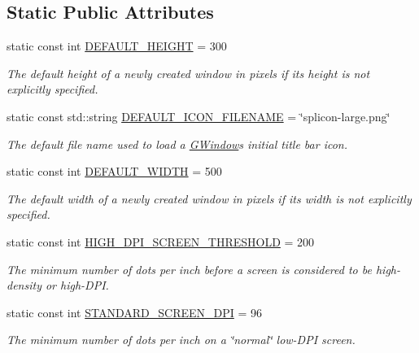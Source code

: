 \subsection*{Static Public Attributes}
\begin{DoxyCompactItemize}
\item 
static const int \mbox{\hyperlink{classsgl_1_1GWindow_a2fab6d7a2bcb15d1595cacc38230f21b}{D\+E\+F\+A\+U\+L\+T\+\_\+\+H\+E\+I\+G\+HT}} = 300
\begin{DoxyCompactList}\small\item\em The default height of a newly created window in pixels if its height is not explicitly specified. \end{DoxyCompactList}\item 
static const std\+::string \mbox{\hyperlink{classsgl_1_1GWindow_a666fcf3a55503322fbfd6314c4846542}{D\+E\+F\+A\+U\+L\+T\+\_\+\+I\+C\+O\+N\+\_\+\+F\+I\+L\+E\+N\+A\+ME}} = \char`\"{}splicon-\/large.\+png\char`\"{}
\begin{DoxyCompactList}\small\item\em The default file name used to load a \mbox{\hyperlink{classsgl_1_1GWindow}{G\+Window}}\textquotesingle{}s initial title bar icon. \end{DoxyCompactList}\item 
static const int \mbox{\hyperlink{classsgl_1_1GWindow_af7b8fc8ce7f700c853cfbc36ee8cc474}{D\+E\+F\+A\+U\+L\+T\+\_\+\+W\+I\+D\+TH}} = 500
\begin{DoxyCompactList}\small\item\em The default width of a newly created window in pixels if its width is not explicitly specified. \end{DoxyCompactList}\item 
static const int \mbox{\hyperlink{classsgl_1_1GWindow_a212e92d31b813ef25adbb902ffae3c6b}{H\+I\+G\+H\+\_\+\+D\+P\+I\+\_\+\+S\+C\+R\+E\+E\+N\+\_\+\+T\+H\+R\+E\+S\+H\+O\+LD}} = 200
\begin{DoxyCompactList}\small\item\em The minimum number of dots per inch before a screen is considered to be high-\/density or high-\/\+D\+PI. \end{DoxyCompactList}\item 
static const int \mbox{\hyperlink{classsgl_1_1GWindow_a28d634f1a144a0f1aabf338f0be6afe2}{S\+T\+A\+N\+D\+A\+R\+D\+\_\+\+S\+C\+R\+E\+E\+N\+\_\+\+D\+PI}} = 96
\begin{DoxyCompactList}\small\item\em The minimum number of dots per inch on a \char`\"{}normal\char`\"{} low-\/\+D\+PI screen. \end{DoxyCompactList}\end{DoxyCompactItemize}
